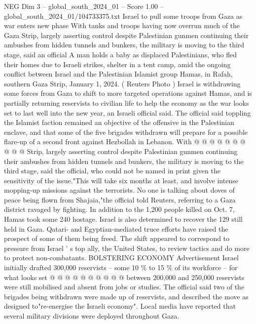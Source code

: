 \begin{textsample}{NEG Dim 3 – global\_south\_2024\_01 – Score 1.00 – global\_south\_2024\_01/104733375.txt}  \label{ex:f3_neg_101}
Israel to pull some troops from Gaza as war enters new phase With tanks and troops having now overrun much of the Gaza Strip, largely asserting control despite Palestinian gunmen continuing their ambushes from hidden tunnels and bunkers, the military is moving to the third stage, said an official A man holds a baby as displaced Palestinians, who fled their homes due to Israeli strikes, shelter in a tent camp, amid the ongoing conflict between Israel and the Palestinian Islamist group Hamas, in Rafah, southern Gaza Strip, January 1, 2024. ( Reuters Photo ) Israel is withdrawing some forces from Gaza to shift to more targeted operations against Hamas, and is partially returning reservists to civilian life to help the economy as the war looks set to last well into the new year, an Israeli official said.
The official said toppling the Islamist faction remained an objective of the offensive in the Palestinian enclave, and that some of the five brigades withdrawn will prepare for a possible flare-up of a second front against Hezbollah in Lebanon.
With @ @ @ @ @ @ @ @ @ @ Strip, largely asserting control despite Palestinian gunmen continuing their ambushes from hidden tunnels and bunkers, the military is moving to the third stage, said the official, who could not be named in print given the sensitivity of the issue."This will take six months at least, and involve intense mopping-up missions against the terrorists.
No one is talking about doves of peace being flown from Shajaia,"the official told Reuters, referring to a Gaza district ravaged by fighting.
In addition to the 1,200 people killed on Oct. 7, Hamas took some 240 hostage.
Israel is also determined to recover the 129 still held in Gaza.
Qatari- and Egyptian-mediated truce efforts have raised the prospect of some of them being freed.
The shift appeared to correspond to pressure from Israel ' s top ally, the United States, to review tactics and do more to protect non-combatants.
BOLSTERING ECONOMY Advertisement Israel initially drafted 300,000 reservists -- some 10 \% to 15 \% of its workforce -- for what looks set @ @ @ @ @ @ @ @ @ @ between 200,000 and 250,000 reservists were still mobilised and absent from jobs or studies.
The official said two of the brigades being withdrawn were made up of reservists, and described the move as designed to"re-energise the Israeli economy".
Local media have reported that several military divisions were deployed throughout Gaza.

\end{textsample}
